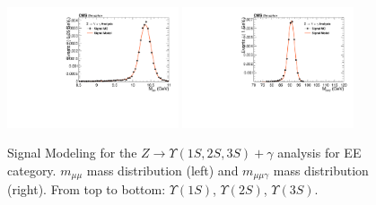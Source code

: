 \begin{figure}[!htbp]
\begin{center}
\includegraphics[width=0.45\textwidth]{figures_and_tables/fitPlotFiles2D/ZToUpsilonPhotonSignalAndBackgroundFit/mMuMNU_ZToUpsilon3SPhotonSignalAndBackgroundFit_Signal_Cat3}\hspace*{1.cm}
\includegraphics[width=0.45\textwidth]{figures_and_tables/fitPlotFiles2D/ZToUpsilonPhotonSignalAndBackgroundFit/mHZ_ZToUpsilon3SPhotonSignalAndBackgroundFit_Signal_Cat3_default}\hspace*{1.cm}


\end{center}\vspace*{-.5cm}
\caption{Signal Modeling for the $Z \rightarrow \Upsilon(1S,2S,3S) +\gamma$ analysis for EE category. $m_{\mu\mu}$ mass distribution (left) and $m_{\mu\mu\gamma}$ mass distribution (right). From top to bottom: $\Upsilon(1S)$, $\Upsilon(2S)$, $\Upsilon(3S)$.}
\label{fig:ZToUpsilon_Signal_Cat3}
\end{figure}

